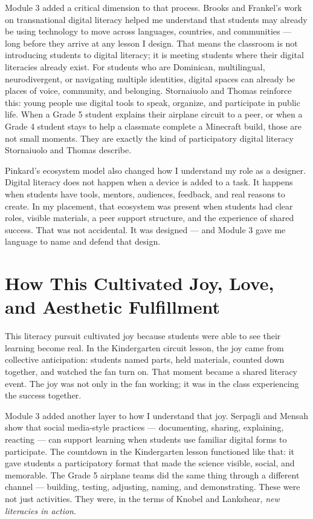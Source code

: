 \documentclass[12pt]{article}
\begin{document}
Module 3 added a critical dimension to that process. Brooks and Frankel's work on transnational digital literacy helped me understand that students may already be using technology to move across languages, countries, and communities --- long before they arrive at any lesson I design. That means the classroom is not introducing students to digital literacy; it is meeting students where their digital literacies already exist. For students who are Dominican, multilingual, neurodivergent, or navigating multiple identities, digital spaces can already be places of voice, community, and belonging. Stornaiuolo and Thomas reinforce this: young people use digital tools to speak, organize, and participate in public life. When a Grade 5 student explains their airplane circuit to a peer, or when a Grade 4 student stays to help a classmate complete a Minecraft build, those are not small moments. They are exactly the kind of participatory digital literacy Stornaiuolo and Thomas describe.

Pinkard's ecosystem model also changed how I understand my role as a designer. Digital literacy does not happen when a device is added to a task. It happens when students have tools, mentors, audiences, feedback, and real reasons to create. In my placement, that ecosystem was present when students had clear roles, visible materials, a peer support structure, and the experience of shared success. That was not accidental. It was designed --- and Module 3 gave me language to name and defend that design.

\section*{How This Cultivated Joy, Love, and Aesthetic Fulfillment}

This literacy pursuit cultivated joy because students were able to see their learning become real. In the Kindergarten circuit lesson, the joy came from collective anticipation: students named parts, held materials, counted down together, and watched the fan turn on. That moment became a shared literacy event. The joy was not only in the fan working; it was in the class experiencing the success together.

Module 3 added another layer to how I understand that joy. Serpagli and Mensah show that social media-style practices --- documenting, sharing, explaining, reacting --- can support learning when students use familiar digital forms to participate. The countdown in the Kindergarten lesson functioned like that: it gave students a participatory format that made the science visible, social, and memorable. The Grade 5 airplane teams did the same thing through a different channel --- building, testing, adjusting, naming, and demonstrating. These were not just activities. They were, in the terms of Knobel and Lankshear, \textit{new literacies in action}.
\end{document}
